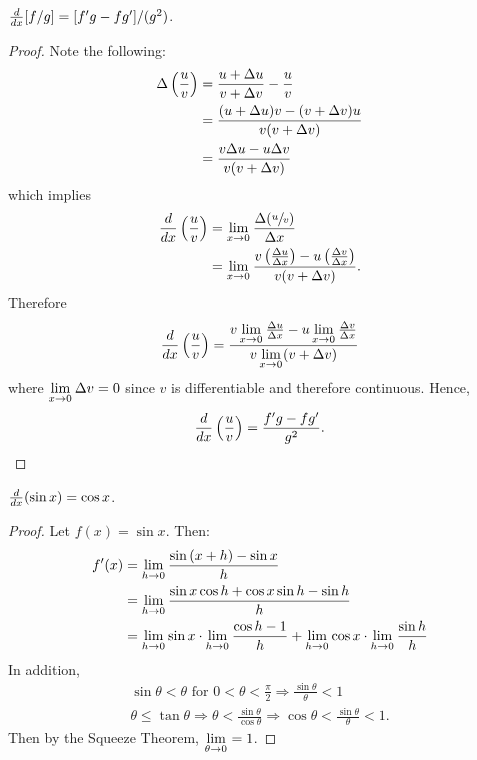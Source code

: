 \documentclass[a4paper,11pt]{article}
\begin{document}
\begin{outline}
    \(\frac{d}{dx}[f/g] = [f'g-fg']/(g^2)\).
    
    \begin{proof}
      Note the following:
      \begin{align*}
        \Delta \left(\frac{u}{v}\right) 
          &=\frac{u+\Delta u}{v+\Delta v} - \frac{u}{v}\\
          &=\frac{(u+\Delta u)v-(v+\Delta v)u}{v(v+\Delta v)}\\
          &=\frac{v\Delta u-u\Delta v}{v(v+\Delta v)}\\
      \end{align*}
      which implies
      \begin{align*}
        \frac{d}{dx}\left(\frac{u}{v}\right) 
          &= \lim\limits_{x\rightarrow 0^{}}\frac{\Delta(\sfrac{u}{v})}{\Delta x}\\
          &= \lim\limits_{x\rightarrow 0^{}}\frac{v\left(\frac{\Delta u}{\Delta x}\right) -
             u\left(\frac{\Delta v}{\Delta x}\right)}{v(v+\Delta v)}\text{.}
      \end{align*}
      Therefore
      \[
        \frac{d}{dx}\left(\frac{u}{v}\right) 
          = \frac{v\lim\limits_{x\rightarrow 0^{}}\frac{\Delta u}{\Delta x}-u\lim\limits_{x\rightarrow 0^{}}\frac{\Delta v}{\Delta x}}{v\lim\limits_{x\rightarrow 0^{}}(v+\Delta v)}
      \]
      where \(\lim\limits_{x\rightarrow 0^{}} \Delta v = 0\) since \(v\) is differentiable and therefore continuous. Hence, 
      \[
        \frac{d}{dx}\left(\frac{u}{v}\right) = \frac{f'g-fg'}{g^2}\text{.}
      \]
    \end{proof}
    
    \(\frac{d}{dx}(\sin{x}) = \cos{x}\).
    
    \begin{proof}
      Let \(f(x) = \sin{x}\). Then:
      \begin{align*}
        f'(x) &= \lim\limits_{h\rightarrow 0^{}}\frac{\sin{(x+h)}-\sin{x}}{h}\\
              &= \lim\limits_{h\rightarrow 0^{}}\frac{\sin{x}\cos{h}+\cos{x}\sin{h}-\sin{h}}{h}\\
              &= \lim\limits_{h\rightarrow 0^{}}\sin{x}\cdot\lim\limits_{h\rightarrow 0^{}}\frac{\cos{h}-1}{h} +
                 \lim\limits_{h\rightarrow 0^{}}\cos{x}\cdot\lim\limits_{h\rightarrow 0^{}}\frac{\sin{h}}{h}
      \end{align*}
      In addition, 
      \begin{gather*}
        \sin{\theta}<\theta\text{ for }0<\theta<\frac{\pi}{2}\Rightarrow\frac{\sin{\theta}}{\theta}<1\\
        \theta\leq\tan{\theta}\Rightarrow\theta<\frac{\sin{\theta}}{\cos{\theta}}
          \Rightarrow\cos{\theta}<\frac{\sin{\theta}}{\theta}<1\text{.}
      \end{gather*}
      Then by the Squeeze Theorem, \(\lim\limits_{\theta\rightarrow 0^{}} = 1\). 
      

\end{proof}
\end{outline}
\end{document}
